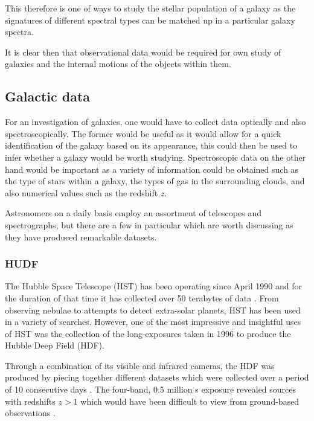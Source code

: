 \documentclass[12pt, twocolumn]{revtex4}    %
\begin{document}
This therefore is one of ways to study the stellar population of a galaxy as the signatures of different spectral types can be matched up in a particular galaxy spectra. 

It is clear then that observational data would be required for own study of galaxies and the internal motions of the objects within them. 

\subsection{Galactic data} 

For an investigation of galaxies, one would have to collect data optically and also spectroscopically. The former would be useful as it would allow for a quick identification of the galaxy based on its appearance, this could then be used to infer whether a galaxy would be worth studying. Spectroscopic data on the other hand would be important as a variety of information could be obtained such as the type of stars within a galaxy, the types of gas in the surrounding clouds, and also numerical values such as the redshift $z$. 

Astronomers on a daily basis employ an assortment of telescopes and spectrographs, but there are a few in particular which are worth discussing as they have produced remarkable datasets.

\subsubsection{HUDF}

The Hubble Space Telescope (HST) has been operating since April 1990 and for the duration of that time it has collected over 50 terabytes of data \citep{mccoy_space_sciences}. From observing nebulae to attempts to detect extra-solar planets, HST has been used in a variety of searches. However, one of the most impressive and insightful uses of HST was the collection of the long-exposures taken in 1996 to produce the Hubble Deep Field (HDF). 

Through a combination of its visible and infrared cameras, the HDF was produced by piecing together different datasets which were collected over a period of 10 consecutive days \citep{mccoy_space_sciences, williams_hdp}. The four-band, 0.5 million s exposure revealed sources with redshifts $z>1$ which would have been difficult to view from ground-based observations \citep{beckwith_hudf}. 

\end{document}
